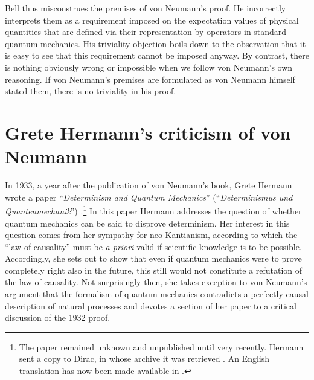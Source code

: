 \documentclass[11pt]{article}
\begin{document}
Bell thus misconstrues the premises of von Neumann's proof. He incorrectly interprets them as a requirement imposed on the expectation values of physical quantities that are defined via their representation by operators in standard quantum mechanics. His triviality objection boils down to the observation that it is easy to see that this requirement cannot be imposed anyway. By contrast, there is nothing obviously wrong or impossible when we follow von Neumann's own reasoning. If von Neumann's premises are formulated as von Neumann himself stated them, there is no triviality in his proof.



\section{Grete Hermann's criticism of von Neumann}\label{Hermann}

In 1933, a year after the publication of von Neumann's book, Grete Hermann wrote a paper ``\emph{Determinism and Quantum Mechanics}'' (``\emph{Determinismus und Quantenmechanik}'') \cite{hermann3}.\footnote{The paper remained unknown and unpublished until very recently. Hermann sent a copy to Dirac, in whose archive it was retrieved \cite[Ch.\@ 8]{crull}. An English translation has now been made available in \cite[Ch.\@ 14]{crull}.}
In this paper Hermann addresses the question of whether quantum mechanics can be said to disprove determinism. Her interest in this question comes from her sympathy for neo-Kantianism, according to which the ``law of causality'' must be \emph{a priori} valid if scientific knowledge is to be possible. Accordingly, she sets out to show that even if quantum mechanics were to prove completely right also in the future, this still would not constitute a refutation of the law of causality. Not surprisingly then, she takes exception to von Neumann's argument that the formalism of quantum mechanics contradicts a perfectly causal description of natural processes and devotes a section of her paper to a critical discussion of the 1932 proof.
\end{document}
